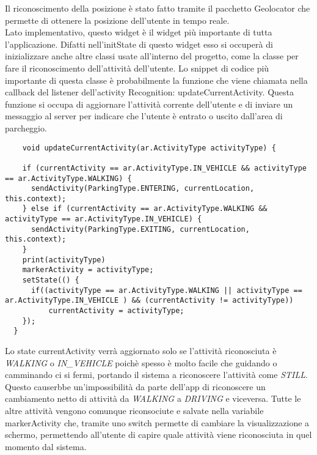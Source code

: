 \documentclass[../../Report.tex]{subfiles}
\begin{document}
Il riconoscimento della posizione è stato fatto tramite il pacchetto Geolocator che permette di ottenere la posizione dell'utente in tempo reale.\\

Lato implementativo, questo widget è il widget più importante di tutta l'applicazione. Difatti nell'initState di questo widget esso si occuperà di inizializzare anche altre classi usate all'interno del progetto, come la classe per fare il riconoscimento dell'attività dell'utente. Lo snippet di codice più importante di questa classe è probabilmente la funzione che viene chiamata nella callback del listener dell'activity Recognition: updateCurrentActivity. Questa funzione si occupa di aggiornare l'attività corrente dell'utente e di inviare un messaggio al server per indicare che l'utente è entrato o uscito dall'area di parcheggio.\\
\begin{lstlisting}
    void updateCurrentActivity(ar.ActivityType activityType) {
   
    if (currentActivity == ar.ActivityType.IN_VEHICLE && activityType == ar.ActivityType.WALKING) {
      sendActivity(ParkingType.ENTERING, currentLocation, this.context);
    } else if (currentActivity == ar.ActivityType.WALKING && activityType == ar.ActivityType.IN_VEHICLE) { 
      sendActivity(ParkingType.EXITING, currentLocation, this.context); 
    }
    print(activityType)
    markerActivity = activityType;
    setState(() {
      if((activityType == ar.ActivityType.WALKING || activityType == ar.ActivityType.IN_VEHICLE ) && (currentActivity != activityType)) 
          currentActivity = activityType;
    });
  }
\end{lstlisting}
Lo state currentActivity verrà aggiornato solo se l'attività riconosciuta è \emph{WALKING} o \emph{IN\_VEHICLE} poichè spesso è molto facile che guidando o camminando ci si fermi, portando il sistema a riconoscere l'attività come \emph{STILL}. Questo causerbbe un'impossibilità da parte dell'app di riconoscere un cambiamento netto di attività da \emph{WALKING} a \emph{DRIVING} e viceversa. Tutte le altre attività vengono comunque riconsociute e salvate nella variabile markerActivity che, tramite uno switch permette di cambiare la visualizzazione a schermo, permettendo all'utente di capire quale attività viene riconosciuta in quel momento dal sistema.\\
\end{document}
